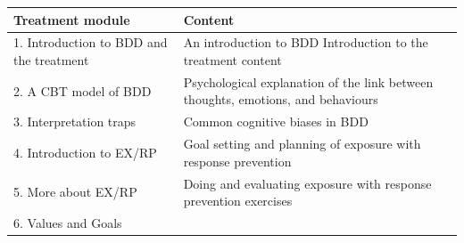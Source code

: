 \documentclass[]{book}
\theoremstyle{definition}
\theoremstyle{definition}
\theoremstyle{definition}
\theoremstyle{remark}
\begin{document}
\begin{longtable}[]{@{}ll@{}}
\toprule
\begin{minipage}[b]{0.47\columnwidth}\raggedright
\textbf{Treatment module}\strut
\end{minipage} & \begin{minipage}[b]{0.47\columnwidth}\raggedright
\textbf{Content}\strut
\end{minipage}\tabularnewline
\midrule
\endhead
\begin{minipage}[t]{0.47\columnwidth}\raggedright
1. Introduction to BDD and the treatment\strut
\end{minipage} & \begin{minipage}[t]{0.47\columnwidth}\raggedright
An introduction to BDD Introduction to the treatment content\strut
\end{minipage}\tabularnewline
\begin{minipage}[t]{0.47\columnwidth}\raggedright
2. A CBT model of BDD\strut
\end{minipage} & \begin{minipage}[t]{0.47\columnwidth}\raggedright
Psychological explanation of the link between thoughts, emotions, and
behaviours\strut
\end{minipage}\tabularnewline
\begin{minipage}[t]{0.47\columnwidth}\raggedright
3. Interpretation traps\strut
\end{minipage} & \begin{minipage}[t]{0.47\columnwidth}\raggedright
Common cognitive biases in BDD\strut
\end{minipage}\tabularnewline
\begin{minipage}[t]{0.47\columnwidth}\raggedright
4. Introduction to EX/RP\strut
\end{minipage} & \begin{minipage}[t]{0.47\columnwidth}\raggedright
Goal setting and planning of exposure with response prevention\strut
\end{minipage}\tabularnewline
\begin{minipage}[t]{0.47\columnwidth}\raggedright
5. More about EX/RP\strut
\end{minipage} & \begin{minipage}[t]{0.47\columnwidth}\raggedright
Doing and evaluating exposure with response prevention exercises\strut
\end{minipage}\tabularnewline
\begin{minipage}[t]{0.47\columnwidth}\raggedright
6. Values and Goals\strut

\end{minipage}
\end{longtable}
\end{document}
